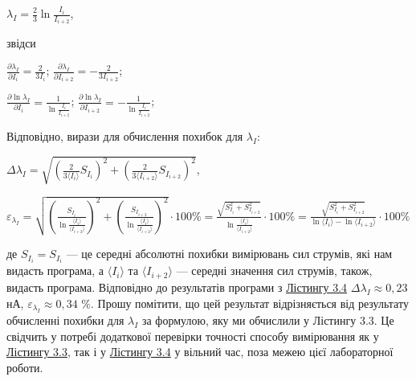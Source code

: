 \documentclass[12pt,a4paper]{article}
\begin{document}
    \begin{center}
        $\displaystyle \lambda_I = \frac{2}{3} \ln \frac{I_i}{I_{i+2}}$,
    \end{center}

    звідси

    \begin{center}
        $\displaystyle \frac{\partial \lambda_I}{\partial I_i} = \frac{2}{3I_i}$; $\displaystyle \frac{\partial \lambda_I}{\partial I_{i+2}} = -\frac{2}{3I_{i+2}}$;
    \end{center}

    \begin{center}
        $\displaystyle \frac{\partial \ln \lambda_I}{\partial I_i} = \frac{1}{\ln \frac{I_i}{I_{i+2}}}$; $\displaystyle \frac{\partial \ln \lambda_I}{\partial I_{i+2}} = -\frac{1}{\ln \frac{I_i}{I_{i+2}}}$;
    \end{center}

    Відповідно, вирази для обчислення похибок для $\lambda_I$:

    \begin{center}
        $\displaystyle \Delta \lambda_I = \sqrt{\left( \frac{2}{3\text{⟨}I_i\text{⟩}} S_{I_i} \right)^2 + \left( \frac{2}{3\text{⟨}I_{i+2}\text{⟩}} S_{I_{i+2}}\right)^2}$,
    \end{center}

    \begin{center}
        $\displaystyle \varepsilon_{\lambda_I} = \sqrt{\left( \frac{S_{I_i}}{\ln \frac{\text{⟨}I_i\text{⟩}}{\text{⟨}I_{i+2}\text{⟩}}}\right)^2 + \left( \frac{S_{I_{i+2}}}{\ln \frac{\text{⟨}I_i\text{⟩}}{\text{⟨}I_{i+2}\text{⟩}}} \right)^2} \cdot 100 \% =
        \frac{\sqrt{S_{I_i}^2 + S_{I_{i+2}}^2}}{\ln \frac{\text{⟨}I_i\text{⟩}}{\text{⟨}I_{i+2}\text{⟩}}} \cdot 100 \% = \frac{\sqrt{S_{I_i}^2 + S_{I_{i+2}}^2}}{\ln \text{⟨}I_i\text{⟩} - \ln \text{⟨}I_{i+2}\text{⟩}} \cdot 100 \%$
    \end{center}

    де $S_{I_i} = S_{I_i}$ --- це середні абсолютні похибки вимірювань сил струмів, які нам видасть програма, а $\text{⟨}I_i\text{⟩}$ та $\text{⟨}I_{i+2}\text{⟩}$ --- середні значення сил струмів, також, видасть програма.
    Відповідно до результатів програми з \hyperlink{listing4}{Лістингу 3.4} $\Delta \lambda_I \approx 0,23$ нА, $\varepsilon_{\lambda_I} \approx 0,34$ \%. Прошу помітити, що цей результат відрізняється від результату обчисленні похибки для $\lambda_I$ за формулою, яку ми обчислили у Лістингу 3.3.
    Це свідчить у потребі додаткової перевірки точності способу вимірювання як у \hyperlink{listing3}{Лістингу 3.3}, так і у \hyperlink{listing4}{Лістингу 3.4} у вільний час, поза межею цієї лабораторної роботи.
\end{document}
